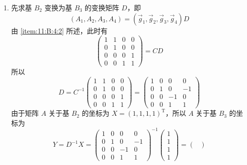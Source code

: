 \documentclass[12pt,fontset=fandol]{ctexart}
\begin{document}
\begin{solve}
\begin{enumerate}
                \item 先求基 $ B_2 $ 变换为基 $ B_3 $ 的变换矩阵 $ D $，即
                      \[ (A_1, A_2, A_3, A_4) = (\vec{g}_1, \vec{g}_2, \vec{g}_3, \vec{g}_4) D \]
                      由 \eqref{item:11:B:4:2} 所述，此时有
                      \[ \begin{pmatrix}
                              1 & 1 & 0 & 0 \\
                              0 & 1 & 0 & 0 \\
                              0 & 0 & 0 & 1 \\
                              0 & 0 & 1 & 1
                          \end{pmatrix} = CD \]
                      所以
                      \[ D = C^{-1} \begin{pmatrix}
                              1 & 1 & 0 & 0 \\
                              0 & 1 & 0 & 0 \\
                              0 & 0 & 0 & 1 \\
                              0 & 0 & 1 & 1
                          \end{pmatrix} = \begin{pmatrix}
                              1 & 0 & 0  & 0  \\
                              0 & 1 & 0  & -1 \\
                              0 & 0 & -1 & 0  \\
                              0 & 0 & 1  & 1
                          \end{pmatrix} \]
                      由于矩阵 $ A $ 关于基 $ B_2 $ 的坐标为 $ X = (1, 1, 1, 1)^{\mathrm{T}} $，所以 $ A $ 关于基 $ B_3 $ 的坐标为
                      \[ Y = D^{-1} X = \begin{pmatrix}
                              1 & 0 & 0  & 0  \\
                              0 & 1 & 0  & -1 \\
                              0 & 0 & -1 & 0  \\
                              0 & 0 & 1  & 1
                          \end{pmatrix}^{-1} \begin{pmatrix} 1 \\ 1 \\ 1 \\ 1 \end{pmatrix} = \begin{pmatrix}

\end{pmatrix}\]
\end{enumerate}
\end{solve}
\end{document}
